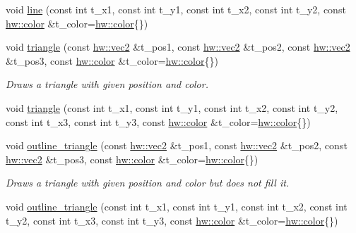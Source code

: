 \begin{DoxyCompactItemize}
void \mbox{\hyperlink{namespacedummy__api_afc5312dbe53632c5a898028246252a13}{line}} (const int t\+\_\+x1, const int t\+\_\+y1, const int t\+\_\+x2, const int t\+\_\+y2, const \mbox{\hyperlink{structhw_1_1color}{hw\+::color}} \&t\+\_\+color=\mbox{\hyperlink{structhw_1_1color}{hw\+::color}}\{\})
\item 
\mbox{\label{namespacedummy__api_a5d0771cc0f23a5b8da36bedf8c283a4a}} 
void \mbox{\hyperlink{namespacedummy__api_a5d0771cc0f23a5b8da36bedf8c283a4a}{triangle}} (const \mbox{\hyperlink{structhw_1_1vec2}{hw\+::vec2}} \&t\+\_\+pos1, const \mbox{\hyperlink{structhw_1_1vec2}{hw\+::vec2}} \&t\+\_\+pos2, const \mbox{\hyperlink{structhw_1_1vec2}{hw\+::vec2}} \&t\+\_\+pos3, const \mbox{\hyperlink{structhw_1_1color}{hw\+::color}} \&t\+\_\+color=\mbox{\hyperlink{structhw_1_1color}{hw\+::color}}\{\})
\begin{DoxyCompactList}\small\item\em Draws a triangle with given position and color. \end{DoxyCompactList}\item 
void \mbox{\hyperlink{namespacedummy__api_a39986f66e60a435145031fa476129332}{triangle}} (const int t\+\_\+x1, const int t\+\_\+y1, const int t\+\_\+x2, const int t\+\_\+y2, const int t\+\_\+x3, const int t\+\_\+y3, const \mbox{\hyperlink{structhw_1_1color}{hw\+::color}} \&t\+\_\+color=\mbox{\hyperlink{structhw_1_1color}{hw\+::color}}\{\})
\item 
\mbox{\label{namespacedummy__api_a7799be9f25e4e7e0c30a9bb3df0037f9}} 
void \mbox{\hyperlink{namespacedummy__api_a7799be9f25e4e7e0c30a9bb3df0037f9}{outline\+\_\+triangle}} (const \mbox{\hyperlink{structhw_1_1vec2}{hw\+::vec2}} \&t\+\_\+pos1, const \mbox{\hyperlink{structhw_1_1vec2}{hw\+::vec2}} \&t\+\_\+pos2, const \mbox{\hyperlink{structhw_1_1vec2}{hw\+::vec2}} \&t\+\_\+pos3, const \mbox{\hyperlink{structhw_1_1color}{hw\+::color}} \&t\+\_\+color=\mbox{\hyperlink{structhw_1_1color}{hw\+::color}}\{\})
\begin{DoxyCompactList}\small\item\em Draws a triangle with given position and color but does not fill it. \end{DoxyCompactList}\item 
void \mbox{\hyperlink{namespacedummy__api_a5787cd4a30c15be2bb4e647477821ff3}{outline\+\_\+triangle}} (const int t\+\_\+x1, const int t\+\_\+y1, const int t\+\_\+x2, const int t\+\_\+y2, const int t\+\_\+x3, const int t\+\_\+y3, const \mbox{\hyperlink{structhw_1_1color}{hw\+::color}} \&t\+\_\+color=\mbox{\hyperlink{structhw_1_1color}{hw\+::color}}\{\})

\end{DoxyCompactItemize}
